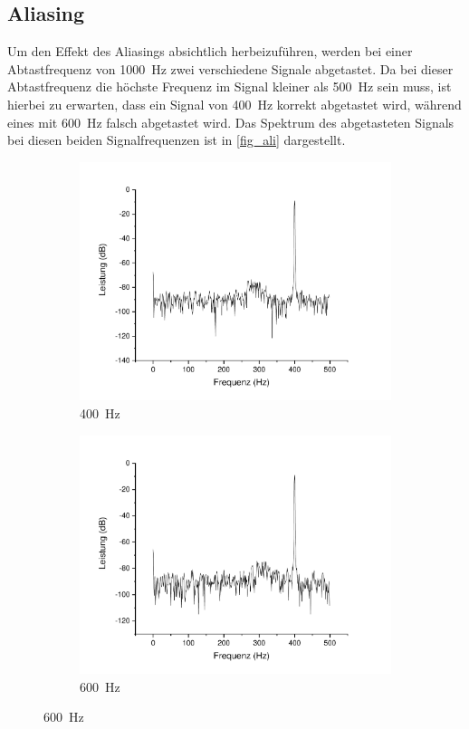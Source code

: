 \documentclass[
a4paper,
12pt,
pagesize,
ngerman
]{scrartcl}
\begin{document}
	\subsection{Aliasing}
	Um den Effekt des Aliasings absichtlich herbeizuführen, werden bei einer Abtastfrequenz von \SI{1000}{\hertz} zwei verschiedene Signale abgetastet.
	Da bei dieser Abtastfrequenz die höchste Frequenz im Signal kleiner als \SI{500}{\hertz} sein muss, ist hierbei zu erwarten, dass ein Signal von \SI{400}{\hertz} korrekt abgetastet wird, während eines mit \SI{600}{\hertz} falsch abgetastet wird.
	Das Spektrum des abgetasteten Signals bei diesen beiden Signalfrequenzen ist in \cref{fig_ali} dargestellt.
	
	\begin{figure}[H]
		\centering
		\begin{subfigure}[t]{0.5\textwidth}
			\centering
			\includegraphics[width=1\textwidth]{Origin-Files/aliasing_abtast1000bei400sig}
			\caption{\SI{400}{\hertz}}
		\end{subfigure}%
		\begin{subfigure}[t]{0.5\textwidth}
			\centering
			\includegraphics[width=1\textwidth]{Origin-Files/aliasing_abtast1000bei600sig}
			\caption{\SI{600}{\hertz}}
		\end{subfigure}
		

\end{figure}
\end{document}
